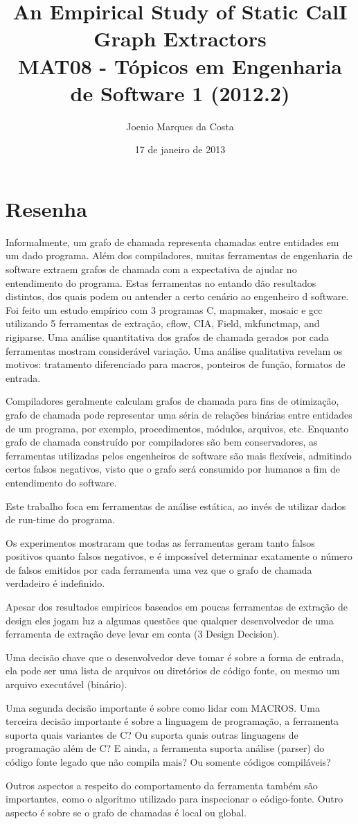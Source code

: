 \documentclass[12pt]{article}
\title{An Empirical Study of Static CalI Graph Extractors
 \cite{CallGraphExtractors} \\
 \large MAT08 - Tópicos em Engenharia de Software 1 (2012.2)}
\author{Joenio Marques da Costa}
\date{17 de janeiro de 2013}
\begin{document}
\maketitle

\section*{Resenha}

Informalmente, um grafo de chamada representa chamadas entre entidades em um
dado programa. Além dos compiladores, muitas ferramentas de engenharia de
software extraem grafos de chamada com a expectativa de ajudar no entendimento
do programa. Estas ferramentas no entando dão resultados distintos, dos quais
podem ou antender a certo cenário ao engenheiro d software. Foi feito um estudo
empírico com 3 programas C, mapmaker, mosaic e gcc utilizando 5 ferramentas de
extração, cflow, CIA, Field, mkfunctmap, and rigiparse. Uma análise
quantitativa dos grafos de chamada gerados por cada ferramentas mostram
considerável variação.  Uma análise qualitativa revelam os motivos: tratamento
diferenciado para macros, ponteiros de função, formatos de entrada.

Compiladores geralmente calculam grafos de chamada para fins de otimização,
grafo de chamada pode representar uma séria de relações binárias entre entidades
de um programa, por exemplo, procedimentos, módulos, arquivos, etc. Enquanto
grafo de chamada construído por compiladores são bem conservadores, as ferramentas
utilizadas pelos engenheiros de software são mais flexíveis, admitindo certos
falsos negativos, visto que o grafo será consumido por humanos a fim de entendimento
do software.

Este trabalho foca em ferramentas de análise estática, ao invés de utilizar
dados de run-time do programa.

Os experimentos mostraram que todas as ferramentas geram tanto falsos positivos
quanto falsos negativos, e é impossível determinar exatamente o número de falsos
emitidos por cada ferramenta uma vez que o grafo de chamada verdadeiro é indefinido.

Apesar dos resultados empiricos baseados em poucas ferramentas de extração de design
eles jogam luz a algumas questões que qualquer desenvolvedor de uma ferramenta
de extração deve levar em conta (3 Design Decision).

Uma decisão chave que o desenvolvedor deve tomar é sobre a forma de entrada,
ela pode ser uma lista de arquivos ou diretórios de código fonte, ou mesmo
um arquivo executável (binário).

Uma segunda decisão importante é sobre como lidar com MACROS. Uma terceira decisão
importante é sobre a linguagem de programação, a ferramenta suporta quais variantes
de C? Ou suporta quais outras linguagens de programação além de C? E ainda, a ferramenta
suporta análise (parser) do código fonte legado que não compila mais? Ou somente
códigos compiláveis?

Outros aspectos a respeito do comportamento da ferramenta também são importantes,
como o algoritmo utilizado para inspecionar o código-fonte. Outro aspecto é sobre
se o grafo de chamadas é local ou global.


\end{document}
